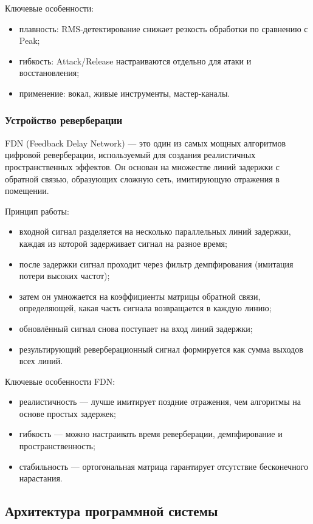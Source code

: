 Ключевые особенности:
\begin{itemize}
	\item плавность: RMS-детектирование снижает резкость обработки по сравнению с Peak;
	\item гибкость: Attack/Release настраиваются отдельно для атаки и восстановления;
	\item применение: вокал, живые инструменты, мастер-каналы.
\end{itemize}

\subsubsection{Устройство реверберации}

FDN (Feedback Delay Network) — это один из самых мощных алгоритмов цифровой реверберации, используемый для создания реалистичных пространственных эффектов. Он основан на множестве линий задержки с обратной связью, образующих сложную сеть, имитирующую отражения в помещении.

Принцип работы:
\begin{itemize}
	\item входной сигнал разделяется на несколько параллельных линий задержки, каждая из которой задерживает сигнал на разное время;
	\item после задержки сигнал проходит через фильтр демпфирования (имитация потери высоких частот);
	\item затем он умножается на коэффициенты матрицы обратной связи, определяющей, какая часть сигнала возвращается в каждую линию;
	\item обновлённый сигнал снова поступает на вход линий задержки;
	\item результирующий реверберационный сигнал формируется как сумма выходов всех линий.
\end{itemize}

Ключевые особенности FDN:
\begin{itemize}
	\item реалистичность — лучше имитирует поздние отражения, чем алгоритмы на основе простых задержек;
	\item гибкость — можно настраивать время реверберации, демпфирование и пространственность;
	\item стабильность — ортогональная матрица гарантирует отсутствие бесконечного нарастания.
\end{itemize}

\subsection{Архитектура программной системы}


